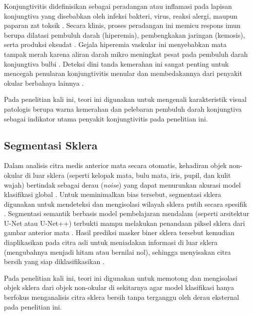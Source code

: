Konjungtivitis didefinisikan sebagai peradangan atau inflamasi pada lapisan konjungtiva yang disebabkan oleh infeksi bakteri, virus, reaksi alergi, maupun paparan zat toksik \parencite{fhadila2023identifikasi, ramadirta2023konjungtivitis}. Secara klinis, proses peradangan ini memicu respons imun berupa dilatasi pembuluh darah (hiperemia), pembengkakan jaringan (kemosis), serta produksi eksudat \parencite{sitompul2017konjungtivitis, fhadila2023identifikasi}. Gejala hiperemia vaskular ini menyebabkan mata tampak merah karena aliran darah mikro meningkat pesat pada pembuluh darah konjungtiva bulbi \parencite{wandini2024konjungtivitis}. Deteksi dini tanda kemerahan ini sangat penting untuk mencegah penularan konjungtivitis menular dan membedakannya dari penyakit okular berbahaya lainnya \parencite{sitompul2017konjungtivitis, ramadirta2023konjungtivitis}.

Pada penelitian kali ini, teori ini digunakan untuk mengenali karakteristik visual patologis berupa warna kemerahan dan pelebaran pembuluh darah konjungtiva sebagai indikator utama penyakit konjungtivitis pada penelitian ini.

\subsection{Segmentasi Sklera}
\label{subsec:segmentasi-sklera}

Dalam analisis citra medis anterior mata secara otomatis, kehadiran objek non-okular di luar sklera (seperti kelopak mata, bulu mata, iris, pupil, dan kulit wajah) bertindak sebagai derau (\textit{noise}) yang dapat menurunkan akurasi model klasifikasi global \parencite{sangeethaa2024enhanced, jiang2023automatic}. Untuk meminimalkan bias tersebut, segmentasi sklera digunakan untuk mendeteksi dan mengisolasi wilayah sklera putih secara spesifik \parencite{madhusudhan2026deep}. Segmentasi semantik berbasis model pembelajaran mendalam (seperti arsitektur U-Net atau U-Net++) terbukti mampu melakukan penandaan piksel sklera dari gambar anterior mata \parencite{madhusudhan2026deep, fuentes2025illumination}. Hasil prediksi masker biner sklera tersebut kemudian diaplikasikan pada citra asli untuk meniadakan informasi di luar sklera (mengubahnya menjadi hitam atau bernilai nol), sehingga menyisakan citra bersih yang siap diklasifikasikan \parencite{fuentes2025illumination}.

Pada penelitian kali ini, teori ini digunakan untuk memotong dan mengisolasi objek sklera dari objek non-okular di sekitarnya agar model klasifikasi hanya berfokus menganalisis citra sklera bersih tanpa terganggu oleh derau eksternal pada penelitian ini.

